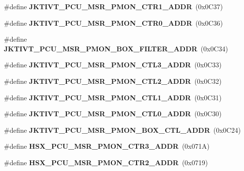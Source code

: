 \begin{DoxyCompactItemize}
\item 
\#define {\bfseries J\+K\+T\+I\+V\+T\+\_\+\+P\+C\+U\+\_\+\+M\+S\+R\+\_\+\+P\+M\+O\+N\+\_\+\+C\+T\+R1\+\_\+\+A\+D\+DR}~(0x0\+C37)\label{types_8h_a001e67bf4a4feb7152a931b060723a04}

\item 
\#define {\bfseries J\+K\+T\+I\+V\+T\+\_\+\+P\+C\+U\+\_\+\+M\+S\+R\+\_\+\+P\+M\+O\+N\+\_\+\+C\+T\+R0\+\_\+\+A\+D\+DR}~(0x0\+C36)\label{types_8h_a9ede207a8291e0310820bbfdc37aef1d}

\item 
\#define {\bfseries J\+K\+T\+I\+V\+T\+\_\+\+P\+C\+U\+\_\+\+M\+S\+R\+\_\+\+P\+M\+O\+N\+\_\+\+B\+O\+X\+\_\+\+F\+I\+L\+T\+E\+R\+\_\+\+A\+D\+DR}~(0x0\+C34)\label{types_8h_a7e85eccc481d06a6519bfd51154c7ae6}

\item 
\#define {\bfseries J\+K\+T\+I\+V\+T\+\_\+\+P\+C\+U\+\_\+\+M\+S\+R\+\_\+\+P\+M\+O\+N\+\_\+\+C\+T\+L3\+\_\+\+A\+D\+DR}~(0x0\+C33)\label{types_8h_ab97bae97fd7d1c56857e5f89c119173f}

\item 
\#define {\bfseries J\+K\+T\+I\+V\+T\+\_\+\+P\+C\+U\+\_\+\+M\+S\+R\+\_\+\+P\+M\+O\+N\+\_\+\+C\+T\+L2\+\_\+\+A\+D\+DR}~(0x0\+C32)\label{types_8h_a178bd4aecdb96cb83d4de4f07ffec300}

\item 
\#define {\bfseries J\+K\+T\+I\+V\+T\+\_\+\+P\+C\+U\+\_\+\+M\+S\+R\+\_\+\+P\+M\+O\+N\+\_\+\+C\+T\+L1\+\_\+\+A\+D\+DR}~(0x0\+C31)\label{types_8h_a0a9b3838ddd114ec631262849f2734ce}

\item 
\#define {\bfseries J\+K\+T\+I\+V\+T\+\_\+\+P\+C\+U\+\_\+\+M\+S\+R\+\_\+\+P\+M\+O\+N\+\_\+\+C\+T\+L0\+\_\+\+A\+D\+DR}~(0x0\+C30)\label{types_8h_a1a3668e652ba91a65d67f5384fa8d3fb}

\item 
\#define {\bfseries J\+K\+T\+I\+V\+T\+\_\+\+P\+C\+U\+\_\+\+M\+S\+R\+\_\+\+P\+M\+O\+N\+\_\+\+B\+O\+X\+\_\+\+C\+T\+L\+\_\+\+A\+D\+DR}~(0x0\+C24)\label{types_8h_a0f6f4bf765e37b43b61d6990ebbf8f1b}

\item 
\#define {\bfseries H\+S\+X\+\_\+\+P\+C\+U\+\_\+\+M\+S\+R\+\_\+\+P\+M\+O\+N\+\_\+\+C\+T\+R3\+\_\+\+A\+D\+DR}~(0x071\+A)\label{types_8h_ad134650f1639391f3d610c70ef9f1e96}

\item 
\#define {\bfseries H\+S\+X\+\_\+\+P\+C\+U\+\_\+\+M\+S\+R\+\_\+\+P\+M\+O\+N\+\_\+\+C\+T\+R2\+\_\+\+A\+D\+DR}~(0x0719)\label{types_8h_ab8068f1d692e5ced75fd5262c5d8cb8f}


\end{DoxyCompactItemize}
